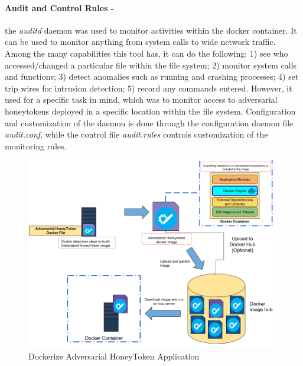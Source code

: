 \documentclass[grad,lot,lof,11pt,oneside,onehalfspace]{RUthesis}
\begin{document}
\paragraph{Audit and Control Rules -} the \textit{auditd} daemon was used to monitor activities within the docker container.  It can be used to monitor anything from system calls to wide network traffic. Among the many capabilities this tool has, it can do the following: 1) see who accessed/changed a particular file within the file system; 2) monitor system calls and functions; 3) detect anomalies such as running and crashing processes; 4)
set trip wires for intrusion detection; 5) record any commands entered. However, it used for a specific task in mind, which was to monitor access to adversarial honeytokens deployed in a specific location within the file system. Configuration and customization of the daemon is done through the configuration daemon file \textit{audit.conf}, while the control file \textit{audit.rules} controls customization of the monitoring rules.
\begin{figure}[hbt!]
	\centering
	\includegraphics[width=0.7\linewidth]{"Images/Chapter 5/Docker"}
	\caption{Dockerize Adversarial HoneyToken Application}
	\label{fig:Docker}
\end{figure}
\end{document}
